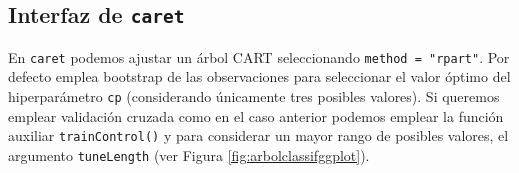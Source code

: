 \documentclass[
  spanish,
]{book}
\newenvironment{Shaded}{\begin{snugshade}}{\end{snugshade}}
\newcommand{\AttributeTok}[1]{\textcolor[rgb]{0.77,0.63,0.00}{#1}}
\newcommand{\CommentTok}[1]{\textcolor[rgb]{0.56,0.35,0.01}{\textit{#1}}}
\newcommand{\DecValTok}[1]{\textcolor[rgb]{0.00,0.00,0.81}{#1}}
\newcommand{\FunctionTok}[1]{\textcolor[rgb]{0.00,0.00,0.00}{#1}}
\newcommand{\NormalTok}[1]{#1}
\newcommand{\OtherTok}[1]{\textcolor[rgb]{0.56,0.35,0.01}{#1}}
\newcommand{\SpecialCharTok}[1]{\textcolor[rgb]{0.00,0.00,0.00}{#1}}
\newcommand{\StringTok}[1]{\textcolor[rgb]{0.31,0.60,0.02}{#1}}
\theoremstyle{break}
\theoremstyle{definition}
\theoremstyle{definition}
\theoremstyle{definition}
\theoremstyle{definition}
\theoremstyle{remark}
\begin{document}
\hypertarget{interfaz-de-caret}{%
\subsection{\texorpdfstring{Interfaz de \texttt{caret}}{Interfaz de caret}}\label{interfaz-de-caret}}

En \texttt{caret} podemos ajustar un árbol CART seleccionando \texttt{method\ =\ "rpart"}.
Por defecto emplea bootstrap de las observaciones para seleccionar el valor óptimo del hiperparámetro \texttt{cp} (considerando únicamente tres posibles valores).
Si queremos emplear validación cruzada como en el caso anterior podemos emplear la función auxiliar \texttt{trainControl()} y para considerar un mayor rango de posibles valores, el argumento \texttt{tuneLength} (ver Figura \ref{fig:arbolclassifggplot}).

\begin{Shaded}
\end{Shaded}
\end{document}

